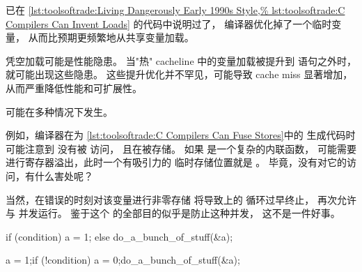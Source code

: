 \begin{description}[labelsep=.4em]
\item[凭空加载（Invented load）] 已在
\cref{lst:toolsoftrade:Living Dangerously Early 1990s Style,%
lst:toolsoftrade:C Compilers Can Invent Loads}
的代码中说明过了，
编译器优化掉了一个临时变量，
从而比预期更频繁地从共享变量加载。

凭空加载可能是性能隐患。
当"热" cacheline 中的变量加载被提升到
 语句之外时，就可能出现这些隐患。
这些提升优化并不罕见，可能导致 cache miss 显著增加，
从而严重降低性能和可扩展性。

\item[凭空存储（Invented store）] 可能在多种情况下发生。
\begin{fcvref}
例如，编译器在为
\cref{lst:toolsoftrade:C Compilers Can Fuse Stores}中的
 生成代码时可能注意到
 没有被  访问，
且在被存储。
如果  是一个复杂的内联函数，
可能需要进行寄存器溢出，此时一个有吸引力的
临时存储位置就是 。
毕竟，没有对它的访问，有什么害处呢？

当然，在错误的时刻对该变量进行非零存储
将导致上的  循环过早终止，
再次允许  与 
并发运行。
鉴于这个  的全部目的似乎是防止这种并发，
这不是一件好事。
\end{fcvref}

\begin{listing}
\begin{fcvlabel}
\begin{VerbatimLL}[commandchars=\\\{\}]
if (condition)
	a = 1;
else
	do_a_bunch_of_stuff(&a);
\end{VerbatimLL}
\end{fcvlabel}
\caption{招致凭空存储}
\label{lst:toolsoftrade:Inviting an Invented Store}
\end{listing}

\begin{listing}
\begin{fcvlabel}
\begin{VerbatimLL}[commandchars=\\\[\]]
a = 1;
if (!condition) {
	a = 0;
	do_a_bunch_of_stuff(&a);
}
\end{VerbatimLL}
\end{fcvlabel}
\caption{编译器发明了一个被招致的存储}
\label{lst:toolsoftrade:Compiler Invents an Invited Store}
\end{listing}


\end{description}
